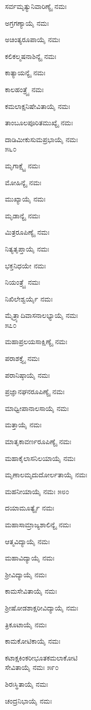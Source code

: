 ಸರ್ವಮೃತ್ಯುನಿವಾರಿಣ್ಯೈ ನಮಃ

ಅಗ್ರಗಣ್ಯಾಯೈ ನಮಃ

ಅಚಿಂತ್ಯರೂಪಾಯೈ ನಮಃ

ಕಲಿಕಲ್ಮಷನಾಶಿನ್ಯೈ ನಮಃ

ಕಾತ್ಯಾಯನ್ಯೈ ನಮಃ

ಕಾಲಹಂತ್ರ್ಯೈ ನಮಃ

ಕಮಲಾಕ್ಷನಿಷೇವಿತಾಯೈ ನಮಃ

ತಾಂಬೂಲಪೂರಿತಮುಖ್ಯೈ ನಮಃ

ದಾಡಿಮೀಕುಸುಮಪ್ರಭಾಯೈ ನಮಃ\\\num{೫೬೦}

ಮೃಗಾಕ್ಷ್ಯೈ ನಮಃ

ಮೋಹಿನ್ಯೈ ನಮಃ

ಮುಖ್ಯಾಯೈ ನಮಃ

ಮೃಡಾನ್ಯೈ ನಮಃ

ಮಿತ್ರರೂಪಿಣ್ಯೈ ನಮಃ

ನಿತ್ಯತೃಪ್ತಾಯೈ ನಮಃ

ಭಕ್ತನಿಧಯೇ ನಮಃ

ನಿಯಂತ್ರ್ಯೈ ನಮಃ

ನಿಖಿಲೇಶ್ವರ್ಯೈ ನಮಃ

ಮೈತ್ರ್ಯಾದಿವಾಸನಾಲಭ್ಯಾಯೈ ನಮಃ\\\num{೫೭೦}

ಮಹಾಪ್ರಲಯಸಾಕ್ಷಿಣ್ಯೈ ನಮಃ

ಪರಾಶಕ್ತ್ಯೈ ನಮಃ

ಪರಾನಿಷ್ಠಾಯೈ ನಮಃ

ಪ್ರಜ್ಞಾನಘನರೂಪಿಣ್ಯೈ ನಮಃ

ಮಾಧ್ವೀಪಾನಾಲಸಾಯೈ ನಮಃ

ಮತ್ತಾಯೈ ನಮಃ

ಮಾತೃಕಾವರ್ಣರೂಪಿಣ್ಯೈ ನಮಃ

ಮಹಾಕೈಲಾಸನಿಲಯಾಯೈ ನಮಃ

ಮೃಣಾಲಮೃದುದೋರ್ಲತಾಯೈ ನಮಃ

ಮಹನೀಯಾಯೈ ನಮಃ \num{೫೮೦}

ದಯಾಮೂರ್ತ್ಯೈ ನಮಃ

ಮಹಾಸಾಮ್ರಾಜ್ಯಶಾಲಿನ್ಯೈ ನಮಃ

ಆತ್ಮವಿದ್ಯಾಯೈ ನಮಃ

ಮಹಾವಿದ್ಯಾಯೈ ನಮಃ

ಶ್ರೀವಿದ್ಯಾಯೈ ನಮಃ

ಕಾಮಸೇವಿತಾಯೈ ನಮಃ

ಶ್ರೀಷೋಡಶಾಕ್ಷರೀವಿದ್ಯಾಯೈ ನಮಃ

ತ್ರಿಕೂಟಾಯೈ ನಮಃ

ಕಾಮಕೋಟಿಕಾಯೈ ನಮಃ

ಕಟಾಕ್ಷಕಿಂಕರೀಭೂತಕಮಲಾಕೋಟಿ\\ಸೇವಿತಾಯೈ ನಮಃ \num{೫೯೦}

ಶಿರಃಸ್ಥಿತಾಯೈ ನಮಃ

ಚಂದ್ರನಿಭಾಯೈ ನಮಃ

